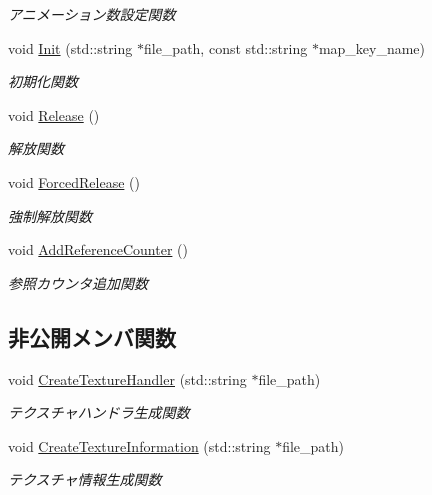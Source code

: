 \begin{DoxyCompactItemize}
\begin{DoxyCompactList}\small\item\em アニメーション数設定関数 \end{DoxyCompactList}\item 
void \mbox{\hyperlink{class_texture_object_a53336f35e430798b4a129ce41b4471d1}{Init}} (std\+::string $\ast$file\+\_\+path, const std\+::string $\ast$map\+\_\+key\+\_\+name)
\begin{DoxyCompactList}\small\item\em 初期化関数 \end{DoxyCompactList}\item 
void \mbox{\hyperlink{class_texture_object_ae16c686e378e64ec9f5c54b2f5ffbd67}{Release}} ()
\begin{DoxyCompactList}\small\item\em 解放関数 \end{DoxyCompactList}\item 
void \mbox{\hyperlink{class_texture_object_a49f22c5ad3a07b24530480d6ec2438d7}{Forced\+Release}} ()
\begin{DoxyCompactList}\small\item\em 強制解放関数 \end{DoxyCompactList}\item 
void \mbox{\hyperlink{class_texture_object_a25be861b1477ac0a6c848c43c0079af9}{Add\+Reference\+Counter}} ()
\begin{DoxyCompactList}\small\item\em 参照カウンタ追加関数 \end{DoxyCompactList}\end{DoxyCompactItemize}
\subsection*{非公開メンバ関数}
\begin{DoxyCompactItemize}
\item 
void \mbox{\hyperlink{class_texture_object_a16c58757e7b36b5447cc8d2c20c66b55}{Create\+Texture\+Handler}} (std\+::string $\ast$file\+\_\+path)
\begin{DoxyCompactList}\small\item\em テクスチャハンドラ生成関数 \end{DoxyCompactList}\item 
void \mbox{\hyperlink{class_texture_object_a7e4b65c1b72ae85779b96178137966c8}{Create\+Texture\+Information}} (std\+::string $\ast$file\+\_\+path)
\begin{DoxyCompactList}\small\item\em テクスチャ情報生成関数 \end{DoxyCompactList}\end{DoxyCompactItemize}
